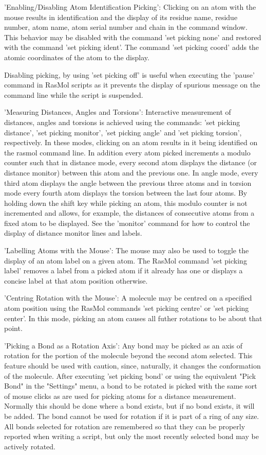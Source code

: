 'Enabling/Disabling Atom Identification Picking':
Clicking on an atom with the mouse results in identification and
the display of its residue name, residue number, atom name, atom serial
number and chain in the command window. This behavior may be disabled
with the command
'set picking none'
and restored with the command
'set picking ident'.
The command
'set picking coord'
adds the atomic coordinates of the atom to the display.

Disabling picking, by using
'set picking off'
is useful when executing the
'pause'
command in RasMol scripts as it prevents the display of
spurious message on the command line while the script is suspended.

'Measuring Distances, Angles and Torsions':
Interactive measurement of distances, angles and torsions
is achieved using the commands:
'set picking distance',
'set picking monitor',
'set picking angle'
and
'set picking torsion',
respectively. In these modes, clicking on an atom results in it
being identified on the rasmol command line. In addition every
atom picked increments a modulo counter such that in distance
mode, every second atom displays the distance (or distance monitor)
between this atom and the previous one. In angle mode, every
third atom displays the angle between the previous three atoms
and in torsion mode every fourth atom displays the torsion between
the last four atoms. By holding down the shift key while picking an
atom, this modulo counter is not incremented and allows, for
example, the distances of consecutive atoms from a fixed atom to
be displayed. See the
'monitor'
command for how to control the display of distance monitor lines and labels.

'Labelling Atoms with the Mouse':
The mouse may also be used to toggle the display of an atom label
on a given atom. The RasMol command
'set picking label'
removes a label from a picked atom if it already has one or
displays a concise label at that atom position otherwise.

'Centring Rotation with the Mouse':
A molecule may be centred on a specified atom position using the
RasMol commands
'set picking centre'
or
'set picking center'.
In this mode, picking an atom causes all futher rotations to be
about that point.

'Picking a Bond as a Rotation Axis':
Any bond may be picked as an axis of rotation for the portion of
the molecule beyond the second atom selected.  This feature should
be used with caution, since, naturally, it changes the conformation
of the molecule.  After executing
'set picking bond'
or using the equivalent "Pick Bond" in the "Settings" menu,
a bond to be rotated is picked with the same sort of mouse clicks
as are used for picking atoms for a distance measurement.  Normally
this should be done where a bond exists, but if no bond exists, it
will be added.  The bond cannot be used for rotation if it is part
of a ring of any size.  All bonds selected for rotation are remembered
so that they can be properly reported when writing a script, but
only the most recently selected bond may be actively rotated.

